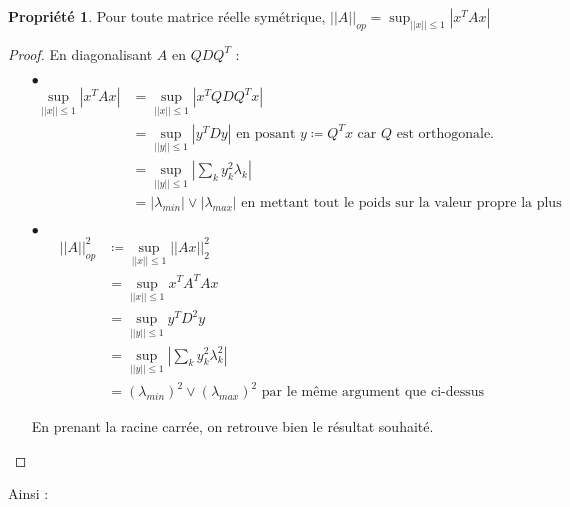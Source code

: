 \documentclass[a4paper, 11pt, french]{article}
\theoremstyle{definition}
\newtheorem{property}{Propriété}
\begin{document}
	\begin{property}
		Pour toute matrice réelle symétrique, $||A||_{op} = \sup_{||x|| \leq 1} |x^T A x|$
	\end{property}
	\begin{proof}
		En diagonalisant $A$ en $QDQ^T$ :
		\begin{itemize}
			\item[$\bullet$]
			\begin{align*}
				\sup_{||x|| \leq 1} |x^T A x| &= \sup_{||x|| \leq 1} |x^T QDQ^T x| \\
				&= \sup_{||y|| \leq 1} |y^T Dy| \text{ en posant $y \coloneqq Q^T x$ car $Q$ est orthogonale.}  \\
				&= \sup_{||y|| \leq 1} \left | \sum_{k} y_k^2 \lambda_k \right | \\
				&= |\lambda_{min}| \lor |\lambda_{max}| \text{ en mettant tout le poids sur la valeur propre la plus extrême.}
			\end{align*}
			
			\item[$\bullet$]
			\begin{align*}
				||A||_{op}^2 &\coloneqq \sup_{||x|| \leq 1} ||Ax||_2^2 \\
				&= \sup_{||x|| \leq 1} x^T A^T A x \\
				&= \sup_{||y|| \leq 1} y^T D^2 y \\
				&= \sup_{||y|| \leq 1} \left | \sum_{k} y_k^2 \lambda_k^2 \right | \\
				&= (\lambda_{min})^2 \lor (\lambda_{max})^2 \text{ par le même argument que ci-dessus}
			\end{align*}
			
			En prenant la racine carrée, on retrouve bien le résultat souhaité.
		\end{itemize}
		
	\end{proof}
	
	Ainsi :
	
\end{document}
